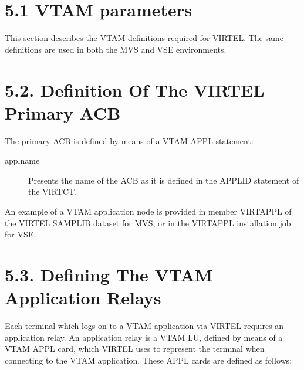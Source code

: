 \documentclass[letterpaper,10pt,english]{sphinxmanual}
\begin{document}
\section{5.1 VTAM parameters}
\label{\detokenize{Installation_Guide:id5}}
This section describes the VTAM definitions required for VIRTEL. The same definitions are used in both the MVS and VSE environments.


\section{5.2. Definition Of The VIRTEL Primary ACB}
\label{\detokenize{Installation_Guide:definition-of-the-virtel-primary-acb}}
The primary ACB is defined by means of a VTAM APPL statement:

\begin{sphinxVerbatim}[commandchars=\\\{\}]
  
\end{sphinxVerbatim}
\begin{description}
\item[{applname}] \leavevmode
Presents the name of the ACB as it is defined in the APPLID statement of the VIRTCT.

\end{description}

An example of a VTAM application node is provided in member VIRTAPPL of the VIRTEL SAMPLIB dataset for MVS, or in the VIRTAPPL installation job for VSE.


\section{5.3. Defining The VTAM Application Relays}
\label{\detokenize{Installation_Guide:defining-the-vtam-application-relays}}
Each terminal which logs on to a VTAM application via VIRTEL requires an application relay. An application relay is a VTAM LU, defined by means of a VTAM APPL card, which VIRTEL uses to represent the terminal when connecting to the VTAM application. These APPL cards are defined as follows:
\end{document}
